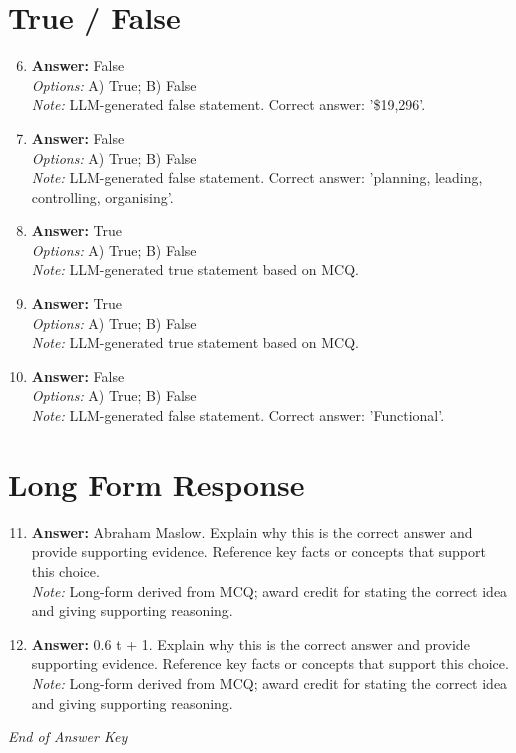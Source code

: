 \documentclass[12pt]{article}
\begin{document}
\section*{True / False}
\begin{enumerate}[label=\arabic*.]
\setcounter{enumi}{5}
\item \textbf{Answer:} False
\\ \textit{Options:} A) True; B) False
\\ \textit{Note:} LLM-generated false statement. Correct answer: '\$19,296'.
\item \textbf{Answer:} False
\\ \textit{Options:} A) True; B) False
\\ \textit{Note:} LLM-generated false statement. Correct answer: 'planning, leading, controlling, organising'.
\item \textbf{Answer:} True
\\ \textit{Options:} A) True; B) False
\\ \textit{Note:} LLM-generated true statement based on MCQ.
\item \textbf{Answer:} True
\\ \textit{Options:} A) True; B) False
\\ \textit{Note:} LLM-generated true statement based on MCQ.
\item \textbf{Answer:} False
\\ \textit{Options:} A) True; B) False
\\ \textit{Note:} LLM-generated false statement. Correct answer: 'Functional'.
\end{enumerate}

\section*{Long Form Response}
\begin{enumerate}[label=\arabic*.]
\setcounter{enumi}{10}
\item \textbf{Answer:} Abraham Maslow. Explain why this is the correct answer and provide supporting evidence. Reference key facts or concepts that support this choice.
\\ \textit{Note:} Long-form derived from MCQ; award credit for stating the correct idea and giving supporting reasoning.
\item \textbf{Answer:} 0.6 t + 1. Explain why this is the correct answer and provide supporting evidence. Reference key facts or concepts that support this choice.
\\ \textit{Note:} Long-form derived from MCQ; award credit for stating the correct idea and giving supporting reasoning.
\end{enumerate}

\vfill
\noindent\textit{End of Answer Key}
\end{document}
